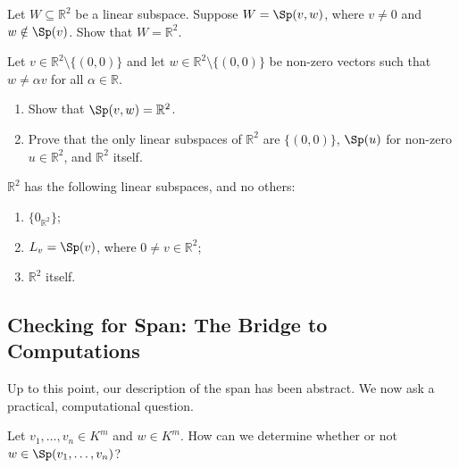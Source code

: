 \begin{exercise}
\label{exc:two_vectors_span_plane}
Let $W \subseteq \mathbb{R}^2$ be a linear subspace. Suppose $W = \Sp(v, w)$, where $v \ne 0$ and $w \notin \Sp(v)$. Show that $W = \mathbb{R}^2$.
\end{exercise}

\begin{exercise}
\label{exc:subspaces_two_dimensions}
Let $v \in \mathbb{R}^2 \setminus \{(0, 0)\}$ and let $w \in \mathbb{R}^2 \setminus \{(0, 0)\}$ be non-zero vectors such that $w \ne \alpha v$ for all $\alpha \in \mathbb{R}$.
\begin{enumerate}
    \item Show that $\Sp(v, w) = \mathbb{R}^2$.
    \item Prove that the only linear subspaces of $\mathbb{R}^2$ are $\{(0, 0)\}$, $\Sp(u)$ for non-zero $u \in \mathbb{R}^2$, and $\mathbb{R}^2$ itself.
\end{enumerate}
\end{exercise}

\begin{summary}
\label{sum:subspaces_of_plane}
$\mathbb{R}^2$ has the following linear subspaces, and no others:
\begin{enumerate}[label=\textbf{(\alph*)}]
    \item $\{0_{\mathbb{R}^2}\}$;
    \item $L_v = \Sp(v)$, where $0 \ne v \in \mathbb{R}^2$;
    \item $\mathbb{R}^2$ itself.
\end{enumerate}
\end{summary}

\subsection{Checking for Span: The Bridge to Computations}

Up to this point, our description of the span has been abstract. We now ask a practical, computational question.

\begin{question}
\label{q:membership_in_span}
Let $v_1, \dots, v_n \in K^m$ and $w \in K^m$. How can we determine whether or not $w \in \Sp(v_1, \dots, v_n)$?
\end{question}

